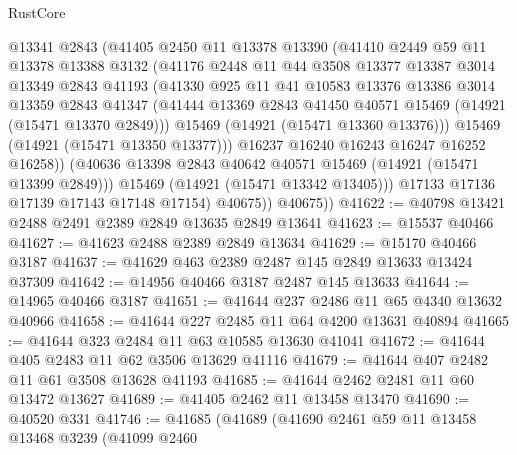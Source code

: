 \begin{lexlean}{RustCore}
\begin{coremodule}
                @13341
                @2843
                (@41405
                  @2450
                  @11
                  @13378
                  @13390
                  (@41410
                    @2449
                    @59
                    @11
                    @13378
                    @13388
                    @3132
                    (@41176
                      @2448
                      @11
                      @44
                      @3508
                      @13377
                      @13387
                      @3014
                      @13349
                      @2843
                      @41193
                      (@41330
                        @925
                        @11
                        @41
                        @10583
                        @13376
                        @13386
                        @3014
                        @13359
                        @2843
                        @41347
                        (@41444 @13369 @2843 @41450 @40571 @15469 (@14921 (@15471 @13370 @2849)))
                        @15469
                        (@14921 (@15471 @13360 @13376)))
                      @15469
                      (@14921 (@15471 @13350 @13377)))
                    @16237
                    @16240
                    @16243
                    @16247
                    @16252
                    @16258))
                (@40636 @13398 @2843 @40642 @40571 @15469 (@14921 (@15471 @13399 @2849)))
                @15469
                (@14921 (@15471 @13342 @13405)))
              @17133
              @17136
              @17139
              @17143
              @17148
              @17154)
            @40675))
        @40675))
@41622 := @40798 @13421 @2488 @2491 @2389 @2849 @13635 @2849 @13641
@41623 := @15537 @40466
@41627 := @41623 @2488 @2389 @2849 @13634
@41629 := @15170 @40466 @3187
@41637 := @41629 @463 @2389 @2487 @145 @2849 @13633 @13424 @37309
@41642 := @14956 @40466 @3187 @2487 @145 @13633
@41644 := @14965 @40466 @3187
@41651 := @41644 @237 @2486 @11 @65 @4340 @13632 @40966
@41658 := @41644 @227 @2485 @11 @64 @4200 @13631 @40894
@41665 := @41644 @323 @2484 @11 @63 @10585 @13630 @41041
@41672 := @41644 @405 @2483 @11 @62 @3506 @13629 @41116
@41679 := @41644 @407 @2482 @11 @61 @3508 @13628 @41193
@41685 := @41644 @2462 @2481 @11 @60 @13472 @13627
@41689 := @41405 @2462 @11 @13458 @13470
@41690 := @40520 @331
@41746 := @41685
    (@41689
      (@41690
        @2461
        @59
        @11
        @13458
        @13468
        @3239
        (@41099
          @2460

\end{coremodule}
\end{lexlean}
